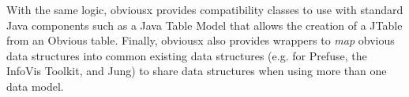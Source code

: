 With the same logic, obviousx provides compatibility classes to use
with standard Java components such as a Java Table Model that allows
the creation of a JTable from an Obvious table.  Finally, obviousx
also provides wrappers to \emph{map} obvious data structures into
common existing data structures (e.g. for Prefuse, the InfoVis
Toolkit, and Jung) to share data structures when using more than one
data model.
